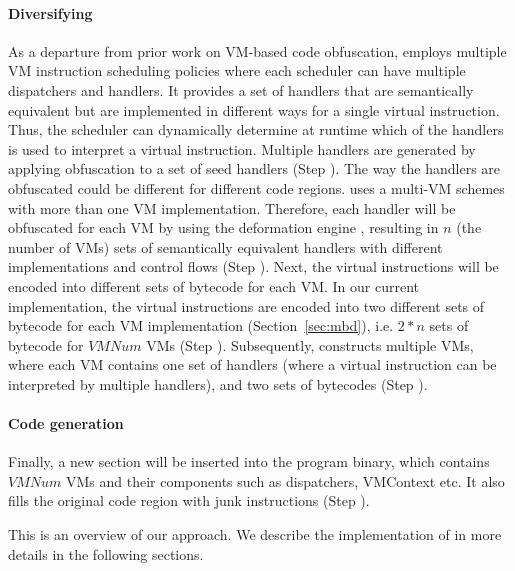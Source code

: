 \paragraph*{Diversifying}
As a departure from prior work on VM-based code obfuscation, \DSVMP employs multiple VM instruction scheduling policies
where each scheduler can have multiple dispatchers and handlers. It provides a set of handlers
that are semantically equivalent but  are implemented in different ways for a single virtual instruction.
Thus, the scheduler can dynamically determine at runtime which of the handlers is used to interpret a virtual instruction.
Multiple handlers are generated by applying obfuscation to a set of seed handlers (Step ).
The way the handlers are obfuscated could be different for different code regions.
\DSVMP uses a multi-VM schemes with more than one VM implementation.
Therefore, each handler will be obfuscated for each VM by using the deformation engine , resulting in $n$ (the number of VMs) sets of semantically equivalent handlers with different implementations and control flows (Step ).
Next, the virtual instructions will be encoded into different sets of bytecode for each VM. In our current implementation, the virtual instructions
are encoded into two different sets of bytecode for each VM implementation (Section~\ref {sec:mbd}), i.e. $2*n$ sets of bytecode for $VMNum$ VMs (Step ). Subsequently, \DSVMP constructs multiple VMs, where each VM contains one set of handlers (where a virtual instruction
can be interpreted by multiple handlers), and two sets of bytecodes (Step ).

\paragraph*{Code generation}
Finally, a new section will be inserted into the program binary, which contains $VMNum$ VMs and their components such as dispatchers, VMContext etc. It also fills the original code region with junk instructions (Step ).

This is an overview of our approach. We describe the implementation of \DSVMP in more details in the following sections.

